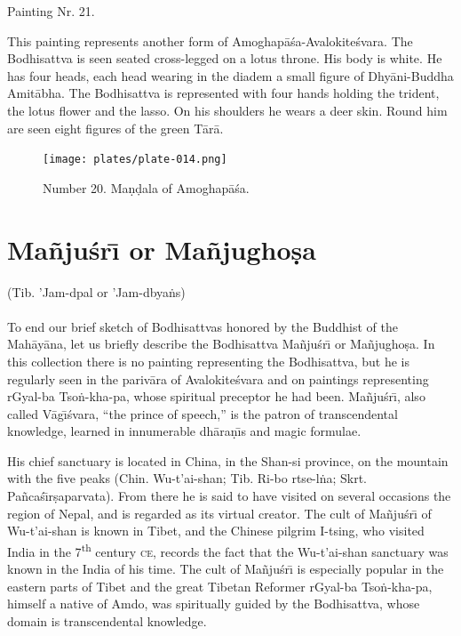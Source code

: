 \documentclass[a4paper, 12pt, oneside]{article}
\begin{document}
Painting Nr. 21.

\bigskip

This painting represents another form of Amoghap\={a}\'{s}a-Avalokite\'{s}vara. The Bodhisattva is seen seated cross-legged on a lotus throne. His body is white. He has four heads, each head wearing in the diadem a small figure of Dhy\={a}ni-Buddha Amit\={a}bha. The Bodhisattva is represented with four hands holding the trident, the lotus flower and the lasso. On his shoulders he wears a deer skin. Round him are seen eight figures of the green T\={a}r\={a}.

\clearpage
\vspace*{\fill}
\begin{figure}[H]
\centering
\texttt{[image: plates/plate-014.png]}
\caption*{Number 20. Ma\d{n}\d{d}ala of Amoghap\={a}\'{s}a.}
\end{figure}
\vspace*{\fill}
\clearpage
\section{Ma\~{n}ju\'{s}r\={\i} or Ma\~{n}jugho\d{s}a}
\begin{center}
(Tib. 'Jam-dpal or 'Jam-dbya\.{n}s)
\end{center}
\paragraph{}
To end our brief sketch of Bodhisattvas honored by the Buddhist of the Mah\={a}y\={a}na, let us briefly describe the Bodhisattva Ma\~{n}ju\'{s}r\={\i} or Ma\~{n}jugho\d{s}a. In this collection there is no painting representing the Bodhisattva, but he is regularly seen in the pariv\={a}ra of Avalokite\'{s}vara and on paintings representing rGyal-ba Tso\.{n}-kha-pa, whose spiritual preceptor he had been. Ma\~{n}ju\'{s}r\={\i}, also called V\={a}g\={\i}\'{s}vara, ``the prince of speech,'' is the patron of transcendental knowledge, learned in innumerable dh\={a}ra\d{n}\={\i}s and magic formulae.

His chief sanctuary is located in China, in the Shan-si province, on the mountain with the five peaks (Chin. Wu-t'ai-shan; Tib. Ri-bo rtse-l\.{n}a; Skrt. Pa\~{n}ca\'{s}\={\i}r\d{s}aparvata). From there he is said to have visited on several occasions the region of Nepal, and is regarded as its virtual creator. The cult of Ma\~{n}ju\'{s}r\={\i} of Wu-t'ai-shan is known in Tibet, and the Chinese pilgrim I-tsing, who visited India in the 7\textsuperscript{th} century \textsc{ce}, records the fact that the Wu-t'ai-shan sanctuary was known in the India of his time. The cult of Ma\~{n}ju\'{s}r\={\i} is especially popular in the eastern parts of Tibet and the great Tibetan Reformer rGyal-ba Tso\.{n}-kha-pa, himself a native of Amdo, was spiritually guided by the Bodhisattva, whose domain is transcendental knowledge.
\end{document}
